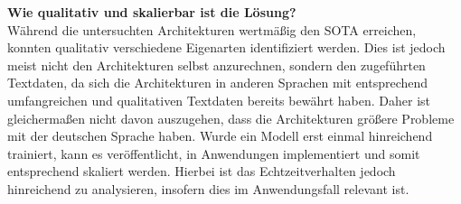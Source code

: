 \noindent
\textbf{Wie qualitativ und skalierbar ist die Lösung?}\\
\noindent
Während die untersuchten Architekturen wertmäßig den \ac{SOTA} erreichen, konnten qualitativ verschiedene Eigenarten identifiziert werden. Dies ist jedoch meist nicht den Architekturen selbst anzurechnen, sondern den zugeführten Textdaten, da sich die Architekturen in anderen Sprachen mit entsprechend umfangreichen und qualitativen Textdaten bereits bewährt haben. Daher ist gleichermaßen nicht davon auszugehen, dass die Architekturen größere Probleme mit der deutschen Sprache haben. Wurde ein Modell erst einmal hinreichend trainiert, kann es veröffentlicht, in Anwendungen implementiert und somit entsprechend skaliert werden. Hierbei ist das Echtzeitverhalten jedoch hinreichend zu analysieren, insofern dies im Anwendungsfall relevant ist.
